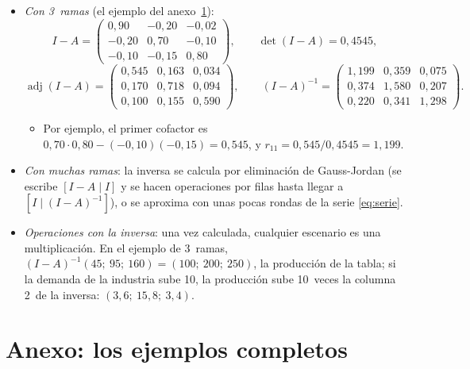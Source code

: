 \documentclass[11pt]{article}
\begin{document}
\begin{itemize}
\begin{itemize}
  \item Sumando la demanda inicial y las 8~primeras rondas de pedidos de la serie \eqref{eq:serie} se llega a $1{,}9502$ y $1{,}5848$; lo que falta son las rondas siguientes, cada una el 18~\% de la de 2~pasos antes ($0{,}6\cdot0{,}3=0{,}18$). Por eso las rondas se acercan a la inversa sin alcanzarla nunca del todo.
  \end{itemize}
\item \emph{Con 3~ramas} (el ejemplo del anexo~\ref{anexo:ejemplo}):
\[
I-A=\begin{pmatrix}0{,}90 & -0{,}20 & -0{,}02\\ -0{,}20 & 0{,}70 & -0{,}10\\ -0{,}10 & -0{,}15 & 0{,}80\end{pmatrix},\qquad \det(I-A)=0{,}4545,
\]
\[
\operatorname{adj}(I-A)=\begin{pmatrix}0{,}545 & 0{,}163 & 0{,}034\\ 0{,}170 & 0{,}718 & 0{,}094\\ 0{,}100 & 0{,}155 & 0{,}590\end{pmatrix},\qquad (I-A)^{-1}=\begin{pmatrix}1{,}199 & 0{,}359 & 0{,}075\\ 0{,}374 & 1{,}580 & 0{,}207\\ 0{,}220 & 0{,}341 & 1{,}298\end{pmatrix}.
\]
  \begin{itemize}
  \item Por ejemplo, el primer cofactor es $0{,}70\cdot0{,}80-(-0{,}10)(-0{,}15)=0{,}545$, y $r_{11}=0{,}545/0{,}4545=1{,}199$.
  \end{itemize}
\item \emph{Con muchas ramas}: la inversa se calcula por eliminación de Gauss-Jordan (se escribe $[I-A\mid I]$ y se hacen operaciones por filas hasta llegar a $[I\mid(I-A)^{-1}]$), o se aproxima con unas pocas rondas de la serie \eqref{eq:serie}.
\item \emph{Operaciones con la inversa}: una vez calculada, cualquier escenario es una multiplicación. En el ejemplo de 3~ramas, $(I-A)^{-1}(45;\ 95;\ 160)=(100;\ 200;\ 250)$, la producción de la tabla; si la demanda de la industria sube 10, la producción sube 10~veces la columna 2~de la inversa: $(3{,}6;\ 15{,}8;\ 3{,}4)$.
\end{itemize}

\section{Anexo: los ejemplos completos}\label{anexo:ejemplo}
\end{document}
